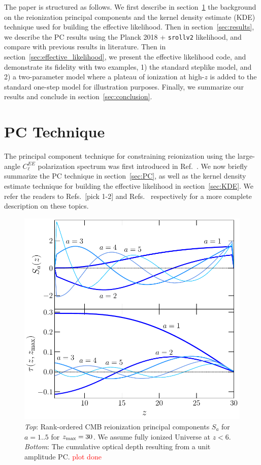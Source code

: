 \documentclass[prd,twocolumn,amsmath,amssymb,floatfix,superscriptaddress,nofootinbib]{revtex4-1}
\newcommand{\zmax}{z_{\rm max}}
\newcommand{\ch}[1]{\textcolor{red}{#1}}
\begin{document}
The paper is structured as follows. We first describe in section~\ref{sec:background} the background on the reionization principal components and the kernel density estimate (KDE) technique used for building the effective likelihood. Then in section~\ref{sec:results}, we describe the PC results using the Planck 2018 + \texttt{srollv2} likelihood, and compare with previous results in literature. Then in section~\ref{sec:effective_likelihood}, we present the effective likelihood code, and demonstrate its fidelity with two examples, 1) the standard steplike model, and 2) a two-parameter model where a plateau of ionization at high-$z$ is added to the standard one-step model for illustration purposes. Finally, we summarize our results and conclude in section~\ref{sec:conclusion}.

%
%
%
%
%

\section{PC Technique}
\label{sec:background}
The principal component technique for constraining reionization using the large-angle $C_\ell^{EE}$ polarization spectrum was first introduced in Ref.~\cite{Hu:2003gh}. We now briefly summarize the PC technique in section~\ref{sec:PC}, as well as the kernel density estimate technique for building the effective likelihood in section~\ref{sec:KDE}. We refer the readers to Refs.~\cite{Hu:2003gh, Mortonson:2008rx, Mortonson:2007hq, Heinrich:2018btc}[pick 1-2] and Refs.~\cite{Heinrich:2016ojb} respectively for a more complete description on these topics.

%
%
 \begin{figure}
          \includegraphics[width=0.95\columnwidth]{paper/plots/pl18_plot_pub_xe_basis_tau_basis_zmax30_heinrich.pdf}
          \caption{\textit{Top}: Rank-ordered CMB reionization principal components $S_a$ for $a = 1..5$ for $\zmax = 30$. We assume fully ionized Universe at $z < 6$. \textit{Bottom}: The cumulative optical depth resulting from a unit amplitude PC. \ch{plot done}} 
          \label{fig:xe}
\end{figure}
 
\end{document}
